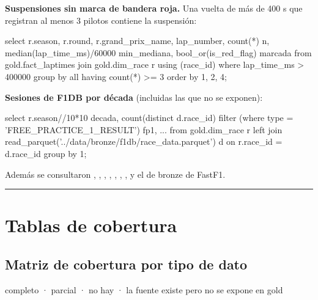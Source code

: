 \textbf{Suspensiones sin marca de bandera roja.} Una vuelta de más de 400 s que registran al menos 3 pilotos contiene la suspensión:

\begin{codigo}
select r.season, r.round, r.grand_prix_name, lap_number, count(*) n,
       median(lap_time_ms)/60000 min_mediana, bool_or(is_red_flag) marcada
from gold.fact_laptimes join gold.dim_race r using (race_id)
where lap_time_ms > 400000 group by all having count(*) >= 3 order by 1, 2, 4;
\end{codigo}

\textbf{Sesiones de F1DB por década} (incluidas las que no se exponen):

\begin{codigo}
select r.season//10*10 decada,
  count(distinct d.race_id) filter (where type = 'FREE_PRACTICE_1_RESULT') fp1, ...
from gold.dim_race r left join read_parquet('../data/bronze/f1db/race_data.parquet') d
  on r.race_id = d.race_id group by 1;
\end{codigo}

Además se consultaron , , , , , , ,  y el  de bronze de FastF1.

\medskip\noindent\textcolor{muted!40}{\rule{\linewidth}{0.3pt}}\medskip

\section{Tablas de cobertura}

\subsection{Matriz de cobertura por tipo de dato}

\si{} completo · \parcial{} parcial · \no{} no hay · \nada{} la fuente existe pero no se expone en gold

